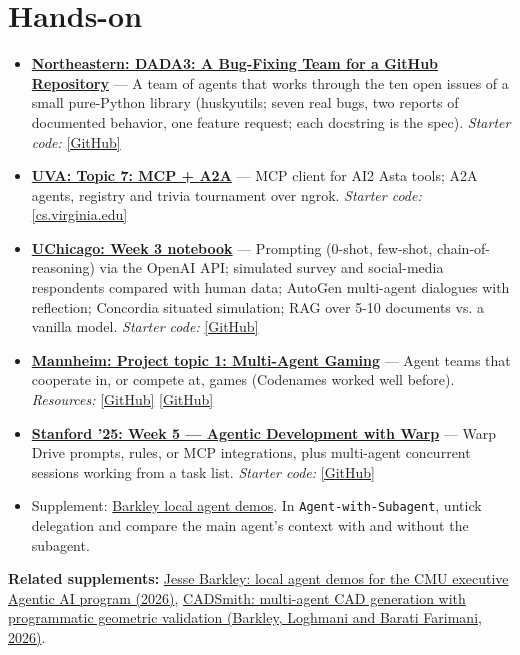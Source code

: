 \documentclass[10pt,oneside]{report}
\begin{document}
\section{Hands-on}
\begin{itemize}
\item \hyperlink{asg-NEU-3}{\textbf{Northeastern: DADA3: A Bug-Fixing Team for a GitHub Repository}} --- A team of agents that works through the ten open issues of a small pure-Python library (huskyutils; seven real bugs, two reports of documented behavior, one feature request; each docstring is the spec). \textit{Starter code:} \href{https://github.com/agenticllms/lecture-files/tree/main/DADA3}{[GitHub]}
\item \hyperlink{asg-UVA-7}{\textbf{UVA: Topic 7: MCP + A2A}} --- MCP client for AI2 Asta tools; A2A agents, registry and trivia tournament over ngrok. \textit{Starter code:} \href{https://www.cs.virginia.edu/\%7Ermw7my/Courses/AgenticAISpring2026/Topic7MCP/mcp.html}{[cs.virginia.edu]}
\item \hyperlink{asg-UCHI-3}{\textbf{UChicago: Week 3 notebook}} --- Prompting (0-shot, few-shot, chain-of-reasoning) via the OpenAI API; simulated survey and social-media respondents compared with human data; AutoGen multi-agent dialogues with reflection; Concordia situated simulation; RAG over 5-10 documents vs. a vanilla model. \textit{Starter code:} \href{https://github.com/KnowledgeLab/AI-Agents-for-Social-Science-and-Society-2026/blob/main/Tutorials-Homework_Notebooks/Week_3.ipynb}{[GitHub]}
\item \hyperlink{asg-MANN-6}{\textbf{Mannheim: Project topic 1: Multi-Agent Gaming}} --- Agent teams that cooperate in, or compete at, games (Codenames worked well before). \textit{Resources:} \href{https://github.com/THUDM/AgentBench}{[GitHub]} \href{https://github.com/microsoft/SmartPlay}{[GitHub]}
\item \hyperlink{asg-STAN25-5}{\textbf{Stanford '25: Week 5 --- Agentic Development with Warp}} --- Warp Drive prompts, rules, or MCP integrations, plus multi-agent concurrent sessions working from a task list. \textit{Starter code:} \href{https://github.com/mihail911/modern-software-dev-assignments/tree/fall2025/week5}{[GitHub]}
\item Supplement: \hyperref[sup-barkley]{Barkley local agent demos}. In \texttt{Agent-with-Subagent}, untick delegation and compare the main agent's context with and without the subagent.
\end{itemize}
\textbf{Related supplements:} \hyperref[sup-barkley]{Jesse Barkley: local agent demos for the CMU executive Agentic AI program (2026)}, \hyperref[sup-cadsmith]{CADSmith: multi-agent CAD generation with programmatic geometric validation (Barkley, Loghmani and Barati Farimani, 2026)}.
\end{document}
